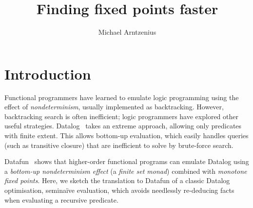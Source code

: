\documentclass[sigplan,screen,review,timestamp,dvipsnames]{acmart}
\title{Finding fixed points faster}
\author{Michael Arntzenius}
\affiliation{University of Birmingham}
\newcommand{\naive}{na\"ive}
\begin{document}


\maketitle

\section{Introduction}



Functional programmers have learned to emulate logic programming using the
effect of \emph{nondeterminism}, usually implemented as backtracking. However,
backtracking search is often inefficient; logic programmers have explored other
useful strategies.
%
Datalog~\citep{datalog} takes an extreme approach, allowing only predicates with
finite extent. This allows bottom-up evaluation, which easily handles queries
(such as transitive closure) that are inefficient to solve by brute-force
search.

Datafun~\cite{datafun} shows that higher-order functional programs can emulate
Datalog using a \emph{bottom-up nondeterminism effect} (a \emph{finite set
  monad}) combined with \emph{monotone fixed points}. Here, we sketch the
translation to Datafun of a classic Datalog optimisation, semi\naive{}
evaluation, which avoids needlessly re-deducing facts when evaluating a
recursive predicate.
\end{document}
